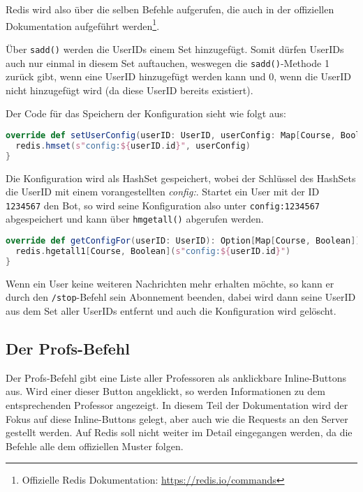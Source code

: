 Redis wird also über die selben Befehle aufgerufen, die auch in der offiziellen Dokumentation aufgeführt werden\footnote{Offizielle Redis Dokumentation: \url{https://redis.io/commands}}.

Über \texttt{sadd()} werden die UserIDs einem Set hinzugefügt. Somit dürfen UserIDs auch nur einmal in diesem Set auftauchen, weswegen die \texttt{sadd()}-Methode 1 zurück gibt, wenn eine UserID hinzugefügt werden kann und 0, wenn die UserID nicht hinzugefügt wird (da diese UserID bereits existiert).

Der Code für das Speichern der Konfiguration sieht wie folgt aus:

\begin{lstlisting}[language=scala, style=scala, caption=Setzen der Userkonfiguration]
override def setUserConfig(userID: UserID, userConfig: Map[Course, Boolean]): Boolean = {
  redis.hmset(s"config:${userID.id}", userConfig)
}
\end{lstlisting}

Die Konfiguration wird als HashSet gespeichert, wobei der Schlüssel des HashSets die UserID mit einem vorangestellten \textit{config:}. Startet ein User mit der ID \texttt{1234567} den Bot, so wird seine Konfiguration also unter \texttt{config:1234567} abgespeichert und kann über \texttt{hmgetall()} abgerufen werden.

\begin{lstlisting}[language=scala, style=scala, caption=Abrufen der Userkonfiguration]
override def getConfigFor(userID: UserID): Option[Map[Course, Boolean]] = {
  redis.hgetall1[Course, Boolean](s"config:${userID.id}")
}
\end{lstlisting}

Wenn ein User keine weiteren Nachrichten mehr erhalten möchte, so kann er durch den \texttt{/stop}-Befehl sein Abonnement beenden, dabei wird dann seine UserID aus dem Set aller UserIDs entfernt und auch die Konfiguration wird gelöscht.

\subsection{Der Profs-Befehl}
Der Profs-Befehl gibt eine Liste aller Professoren als anklickbare Inline-Buttons aus. Wird einer dieser Button angeklickt, so werden Informationen zu dem entsprechenden Professor angezeigt. In diesem Teil der Dokumentation wird der Fokus auf diese Inline-Buttons gelegt, aber auch wie die Requests an den Server gestellt werden. Auf Redis soll nicht weiter im Detail eingegangen werden, da die Befehle alle dem offiziellen Muster folgen.

